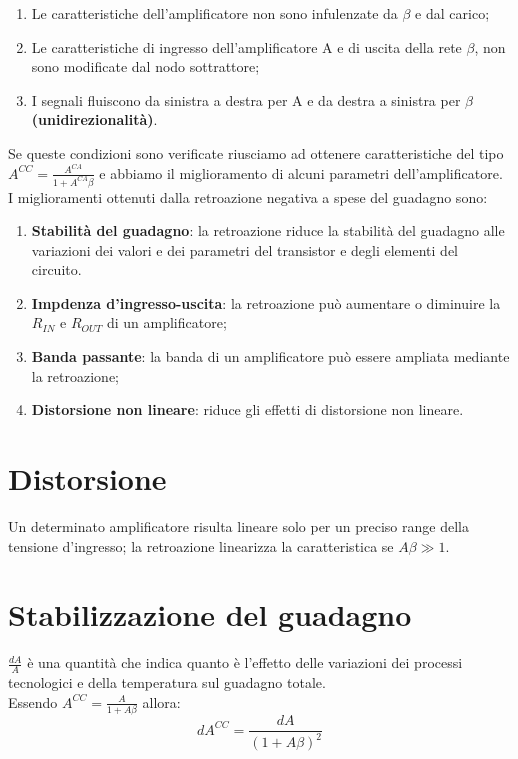 \documentclass[a4paper, 12pt]{book}
\begin{document}
\begin{enumerate}
    \item Le caratteristiche dell'amplificatore non sono infulenzate da $\beta$ e dal carico;
    \item Le caratteristiche di ingresso dell'amplificatore A e di uscita della rete $\beta$, non sono modificate dal nodo sottrattore;
    \item I segnali fluiscono da sinistra a destra per A e da destra a sinistra per $\beta$ \textbf{(unidirezionalità)}.
\end{enumerate}
Se queste condizioni sono verificate riusciamo ad ottenere caratteristiche del tipo $A^{CC} = \frac{A^{CA}}{1+A^{CA}\beta}$ e abbiamo il miglioramento di alcuni parametri dell'amplificatore.
\\I miglioramenti ottenuti dalla retroazione negativa a spese del guadagno sono:
\begin{enumerate}
    \item \textbf{Stabilità del guadagno}: la retroazione riduce la stabilità del guadagno alle variazioni dei valori e dei parametri del transistor e degli elementi del circuito.
    \item \textbf{Impdenza d'ingresso-uscita}: la retroazione può aumentare o diminuire la $R_{IN}$ e $R_{OUT}$ di un amplificatore;
    \item \textbf{Banda passante}: la banda di un amplificatore può essere ampliata mediante la retroazione;
    \item \textbf{Distorsione non lineare}: riduce gli effetti di distorsione non lineare.
\end{enumerate}

\section*{Distorsione}
Un determinato amplificatore risulta lineare solo per un preciso range della tensione d'ingresso; la retroazione linearizza la caratteristica se $A\beta\gg1$.

\section*{Stabilizzazione del guadagno}
$\frac{dA}{A}$ è una quantità che indica quanto è l'effetto delle variazioni dei processi tecnologici e della temperatura sul guadagno totale.
\\Essendo $A^{CC} = \frac{A}{1+A\beta}$ allora:
\begin{equation*}
    dA^{CC}=\frac{dA}{(1+A\beta)^2}
\end{equation*}
\end{document}
